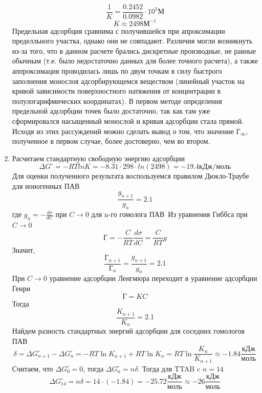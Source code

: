\documentclass[a4paper,12pt]{article}
\begin{document}
\begin{enumerate}
\begin{equation*}
    \frac{1}{K} = \frac{0.2452}{0.0982}\cdot 10^{3} \text{М}
\end{equation*}
\begin{equation*}
    K \approx 2498 \text{М}^{-1}
\end{equation*}
Предельная адсорбция сравнима с получившейся при апроксимации пределльного участка, однако они не совпадают. Различия могли возникнуть из-за того, что в данном расчете брались дискретные производные, не равные обычным (т.е. было недостаточно данных для более точного расчета), а также аппроксимация проводилась лишь по двум точкам в силу быстрого заполнения монослоя адсорбирующемся веществом (линейный участок на кривой зависимости поверхностного натяжения от концентрации в полулогарифмических координатах). В первом методе определения предельной адсорбции точек было достаточно, так как там уже сформировался насыщенный монослой и кривая адсорбции стала прямой. Исходя из этих рассуждений можно сделать вывод о том, что значение $ \text{Г}_{\infty}$, полученное в первом случае, более достоверно, чем во втором.
 
\item
Расчитаем стандартную свободную энергию адсорбции
\begin{equation*}
    \Delta G^{\circ} = - RTlnK = - 8.31\cdot298\cdot ln(2498) = -19.4  \text{кДж/моль}
\end{equation*}
Для оценки полученного результата воспользуемся правилом Дюкло-Траубе для ионогенных ПАВ
\begin{equation*}
    \frac{g_{n+1}}{g_{n}} = 2.1
\end{equation*}
где $g_{n} = -\frac{d\sigma}{dC}$ при $C\rightarrow0$ для n-го гомолога ПАВ\ 
Из уравнения Гиббса при $C\rightarrow0$
\begin{equation*}
    \text{Г} = -\frac{C}{RT}\frac{d\sigma}{dC} = \frac{C}{RT} g
\end{equation*}
Значит, 
\begin{equation*}
    \frac{\text{Г}_{n+1}}{\text{Г}_{n}} = \frac{g_{n+1}}{g_{n}} = 2.1
\end{equation*}
При $C\rightarrow0$ уравнение адсорбции Ленгмюра переходит в уравнение адсорбции Генри 
\begin{equation*}
    \text{Г} = KC
\end{equation*}
Тогда 
\begin{equation*}
    \frac{K_{n+1}}{K_{n}} = 2.1
\end{equation*}
Найдем разность стандартных энергий адсорбции для соседних гомологов ПАВ
\begin{equation*}
    \delta = \Delta G_{n+1}^{\circ} - \Delta G_{n}^{\circ} = - RT\ln{K_{n+1} }+ RT\ln{K_{n}} = RT\ln{\frac{K_{n}}{K_{n+1}}} \approx -1.84 \frac{\text{кДж}}{\text{моль}}
\end{equation*}
Считаем, что $\Delta G_{0}^{\circ} = 0$, тогда $\Delta G_{n}^{\circ} = n\delta$.
Тогда для TTAB c $n = 14$
\begin{equation*}
    \Delta G_{14}^{\circ} = n\delta = 14\cdot(-1.84) = -25.72\frac{\text{кДж}}{\text{моль}}  \approx -26\frac{\text{кДж}}{\text{моль}}
\end{equation*}\


\end{enumerate}
\end{document}
